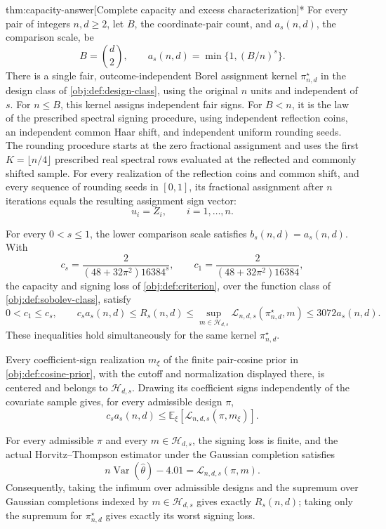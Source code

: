 \documentclass[11pt]{article}
\begin{document}
\begin{theoremv}{thm:capacity-answer}[Complete capacity and excess characterization]*
For every pair of integers \(n,d\geq2\), let \(B\), the coordinate-pair count, and \(a_s(n,d)\), the comparison scale, be
\[
B=\binom d2,\qquad
a_s(n,d)=\min\{1,(B/n)^s\}.
\]
There is a single fair, outcome-independent Borel assignment kernel \(\pi^\star_{n,d}\) in the design class of \cref{obj:def:design-class}, using the original \(n\) units and independent of \(s\). For \(n\leq B\), this kernel assigns independent fair signs. For \(B<n\), it is the law of the prescribed spectral signing procedure, using independent reflection coins, an independent common Haar shift, and independent uniform rounding seeds. The rounding procedure starts at the zero fractional assignment and uses the first \(K=\lfloor n/4\rfloor\) prescribed real spectral rows evaluated at the reflected and commonly shifted sample. For every realization of the reflection coins and common shift, and every sequence of rounding seeds in \([0,1]\), its fractional assignment after \(n\) iterations equals the resulting assignment sign vector:
\[
u_i=Z_i,\qquad i=1,\ldots,n.
\]

For every \(0<s\leq1\), the lower comparison scale satisfies \(b_s(n,d)=a_s(n,d)\). With
\[
c_s=\frac{2}{(48+32\pi^2)16384^s},
\qquad
c_1=\frac{2}{(48+32\pi^2)16384},
\]
the capacity and signing loss of \cref{obj:def:criterion}, over the function class of \cref{obj:def:sobolev-class}, satisfy
\[
0<c_1\leq c_s,\qquad
c_sa_s(n,d)
\leq R_s(n,d)
\leq
\sup_{m\in\mathcal H_{d,s}}
\mathcal L_{n,d,s}(\pi^\star_{n,d},m)
\leq3072a_s(n,d).
\]
These inequalities hold simultaneously for the same kernel \(\pi^\star_{n,d}\).

Every coefficient-sign realization \(m_\xi\) of the finite pair-cosine prior in \cref{obj:def:cosine-prior}, with the cutoff and normalization displayed there, is centered and belongs to \(\mathcal H_{d,s}\). Drawing its coefficient signs independently of the covariate sample gives, for every admissible design \(\pi\),
\[
c_sa_s(n,d)
\leq
\mathbb E_\xi\!\left[\mathcal L_{n,d,s}(\pi,m_\xi)\right].
\]

For every admissible \(\pi\) and every \(m\in\mathcal H_{d,s}\), the signing loss is finite, and the actual Horvitz--Thompson estimator under the Gaussian completion satisfies
\[
n\operatorname{Var}(\widehat\theta)-4.01
=
\mathcal L_{n,d,s}(\pi,m).
\]
Consequently, taking the infimum over admissible designs and the supremum over Gaussian completions indexed by \(m\in\mathcal H_{d,s}\) gives exactly \(R_s(n,d)\); taking only the supremum for \(\pi^\star_{n,d}\) gives exactly its worst signing loss.


\end{theoremv}
\end{document}
